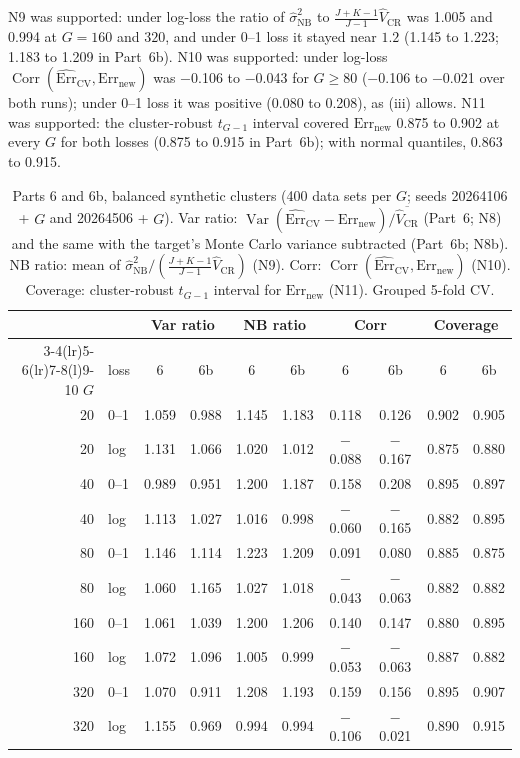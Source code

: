 \documentclass[11pt]{amsart}
\theoremstyle{plain}
\theoremstyle{definition}
\theoremstyle{remark}
\newcommand{\Var}{\operatorname{Var}}
\newcommand{\Corr}{\operatorname{Corr}}
\newcommand{\CV}{\widehat{\mathrm{Err}}_{\mathrm{CV}}}
\newcommand{\Errnew}{\mathrm{Err}_{\mathrm{new}}}
\newcommand{\VCR}{\hat V_{\mathrm{CR}}}
\newcommand{\VNB}{\hat\sigma^2_{\mathrm{NB}}}
\newcommand{\fac}{\tfrac{J+K-1}{J-1}}
\begin{document}
N9 was supported: under log-loss the ratio of $\VNB$ to $\fac\VCR$ was 1.005 and 0.994 at $G=160$ and $320$, and under 0--1 loss it stayed near $1.2$ (1.145 to 1.223; 1.183 to 1.209 in Part~6b). N10 was supported: under log-loss $\Corr(\CV,\Errnew)$ was $-$0.106 to $-$0.043 for $G\ge 80$ ($-$0.106 to $-$0.021 over both runs); under 0--1 loss it was positive (0.080 to 0.208), as (iii) allows. N11 was supported: the cluster-robust $t_{G-1}$ interval covered $\Errnew$ 0.875 to 0.902 at every $G$ for both losses (0.875 to 0.915 in Part~6b); with normal quantiles, 0.863 to 0.915.

\begin{table}[tbp]
\centering\footnotesize
\caption{Parts 6 and 6b, balanced synthetic clusters (400 data sets per $G$; seeds 20264106 + $G$ and 20264506 + $G$). Var ratio: $\Var(\CV-\Errnew)/\overline{\VCR}$ (Part~6; N8) and the same with the target's Monte Carlo variance subtracted (Part~6b; N8b). NB ratio: mean of $\VNB/(\fac\VCR)$ (N9). Corr: $\Corr(\CV,\Errnew)$ (N10). Coverage: cluster-robust $t_{G-1}$ interval for $\Errnew$ (N11). Grouped 5-fold CV.}\label{tab:firstorder}
\begin{tabular}{@{}r l c c c c c c c c@{}}
\toprule
 & & \multicolumn{2}{c}{Var ratio} & \multicolumn{2}{c}{NB ratio} & \multicolumn{2}{c}{Corr} & \multicolumn{2}{c}{Coverage}\\
\cmidrule(lr){3-4}\cmidrule(lr){5-6}\cmidrule(lr){7-8}\cmidrule(l){9-10}
$G$ & loss & 6 & 6b & 6 & 6b & 6 & 6b & 6 & 6b\\
\midrule
20 & 0--1 & 1.059 & 0.988 & 1.145 & 1.183 & 0.118 & 0.126 & 0.902 & 0.905 \\
20 & log & 1.131 & 1.066 & 1.020 & 1.012 & $-$0.088 & $-$0.167 & 0.875 & 0.880 \\
40 & 0--1 & 0.989 & 0.951 & 1.200 & 1.187 & 0.158 & 0.208 & 0.895 & 0.897 \\
40 & log & 1.113 & 1.027 & 1.016 & 0.998 & $-$0.060 & $-$0.165 & 0.882 & 0.895 \\
80 & 0--1 & 1.146 & 1.114 & 1.223 & 1.209 & 0.091 & 0.080 & 0.885 & 0.875 \\
80 & log & 1.060 & 1.165 & 1.027 & 1.018 & $-$0.043 & $-$0.063 & 0.882 & 0.882 \\
160 & 0--1 & 1.061 & 1.039 & 1.200 & 1.206 & 0.140 & 0.147 & 0.880 & 0.895 \\
160 & log & 1.072 & 1.096 & 1.005 & 0.999 & $-$0.053 & $-$0.063 & 0.887 & 0.882 \\
320 & 0--1 & 1.070 & 0.911 & 1.208 & 1.193 & 0.159 & 0.156 & 0.895 & 0.907 \\
320 & log & 1.155 & 0.969 & 0.994 & 0.994 & $-$0.106 & $-$0.021 & 0.890 & 0.915 \\
\bottomrule
\end{tabular}
\end{table}
\end{document}
